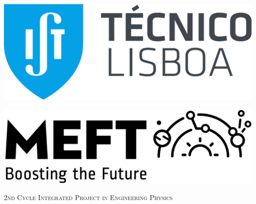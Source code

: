 \documentclass[
11pt, %
english, %
singlespacing, %
headsepline, %
]{MastersDoctoralThesis} %
\author{Filipe Ficalho} %
\begin{document}
\pagestyle{plain} %


\begin{titlepage}

\begin{minipage}[t]{0.4\textwidth}
\begin{flushleft} 
\vspace{0pt}
\hspace{-1cm}
\includegraphics[scale=0.25]{Images/logo.pdf}
\end{flushleft}
\end{minipage}
\hfill
\begin{minipage}[t]{0.41\textwidth}
\begin{flushright} 
\vspace{0pt}
\includegraphics[scale=0.08]{Images/Logo-MEFT_Hor.png}
\end{flushright}
\end{minipage}

\begin{center}

\vspace*{.06\textheight}
{\scshape\LARGE \univname\par}\vspace{1.5cm} %
\textsc{\Large 2nd Cycle Integrated Project in Engineering Physics}\\[0.5cm] %


\end{center}
\end{titlepage}
\end{document}

